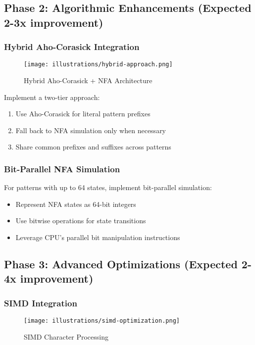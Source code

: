 \documentclass[11pt,a4paper]{article}
\begin{document}
\subsection{Phase 2: Algorithmic Enhancements (Expected 2-3x improvement)}

\subsubsection{Hybrid Aho-Corasick Integration}

\begin{figure}[htbp]
\centering
\texttt{[image: illustrations/hybrid-approach.png]}
\caption{Hybrid Aho-Corasick + NFA Architecture}
\label{fig:hybrid}
\end{figure}

Implement a two-tier approach:
\begin{enumerate}
\item Use Aho-Corasick for literal pattern prefixes
\item Fall back to NFA simulation only when necessary
\item Share common prefixes and suffixes across patterns
\end{enumerate}

\subsubsection{Bit-Parallel NFA Simulation}

For patterns with up to 64 states, implement bit-parallel simulation:
\begin{itemize}
\item Represent NFA states as 64-bit integers
\item Use bitwise operations for state transitions
\item Leverage CPU's parallel bit manipulation instructions
\end{itemize}

\subsection{Phase 3: Advanced Optimizations (Expected 2-4x improvement)}

\subsubsection{SIMD Integration}

\begin{figure}[htbp]
\centering
\texttt{[image: illustrations/simd-optimization.png]}
\caption{SIMD Character Processing}
\label{fig:simd}
\end{figure}
\end{document}
